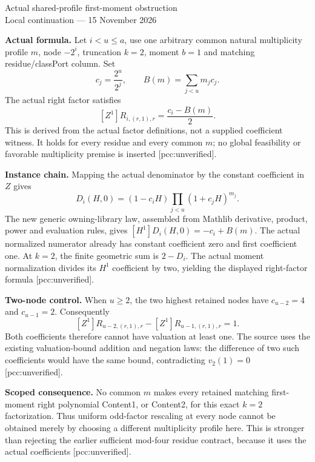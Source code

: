 \documentclass[10pt]{article}
\begin{document}
\begin{center}{\Large Actual shared-profile first-moment obstruction}\\[4pt]
Local continuation --- 15 November 2026\end{center}
\textbf{Actual formula.} Let $i<u\le a$, use one arbitrary common natural
multiplicity profile $m$, node $-2^i$, truncation $k=2$, moment $b=1$ and
matching residue/classPort column. Set
\[
 c_j=\frac{2^u}{2^j},\qquad B(m)=\sum_{j<u}m_jc_j.
\]
The actual right factor satisfies
\[
 [Z^1]R_{i,(r,1),r}=\frac{c_i-B(m)}2.
\]
This is derived from the actual factor definitions, not a supplied
coefficient witness. It holds for every residue and every common $m$;
no global feasibility or favorable multiplicity premise is inserted
[pcc:unverified].

\textbf{Instance chain.} Mapping the actual denominator by the constant
coefficient in $Z$ gives
\[
 D_i(H,0)=(1-c_iH)\prod_{j<u}(1+c_jH)^{m_j}.
\]
The new generic owning-library law, assembled from Mathlib derivative,
product, power and evaluation rules, gives
$[H^1]D_i(H,0)=-c_i+B(m)$. The actual normalized numerator already has
constant coefficient zero and first coefficient one. At $k=2$, the finite
geometric sum is $2-D_i$. The actual moment normalization divides its
$H^1$ coefficient by two, yielding the displayed right-factor formula
[pcc:unverified].

\textbf{Two-node control.} When $u\ge2$, the two highest retained nodes
have $c_{u-2}=4$ and $c_{u-1}=2$. Consequently
\[
 [Z^1]R_{u-2,(r,1),r}-[Z^1]R_{u-1,(r,1),r}=1.
\]
Both coefficients therefore cannot have valuation at least one. The source
uses the existing valuation-bound addition and negation laws: the difference
of two such coefficients would have the same bound, contradicting
$v_2(1)=0$ [pcc:unverified].

\textbf{Scoped consequence.} No common $m$ makes every retained matching
first-moment right polynomial Content1, or Content2, for this exact
$k=2$ factorization. Thus uniform odd-factor rescaling at every node cannot
be obtained merely by choosing a different multiplicity profile here.
This is stronger than rejecting the earlier sufficient mod-four residue
contract, because it uses the actual coefficients [pcc:unverified].
\end{document}
